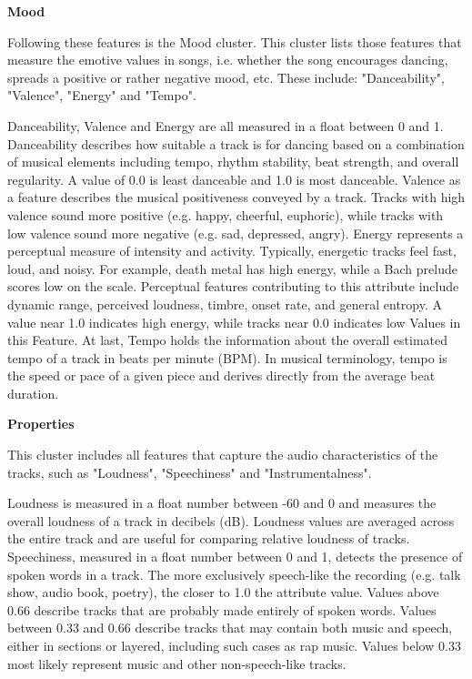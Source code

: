 \textbf{Mood}

Following these features is the Mood cluster.
This cluster lists those features that measure the emotive values in songs, 
i.e. whether the song encourages dancing, spreads a positive or rather negative mood,
etc. These include: "Danceability", "Valence", "Energy" and "Tempo".

Danceability, Valence and Energy are all measured in a float between 0 and 1. 
Danceability describes how suitable a track is for dancing based on a combination of musical elements
including tempo, rhythm stability, beat strength, and overall regularity. 
A value of 0.0 is least danceable and 1.0 is most danceable.
Valence as a feature describes the musical positiveness conveyed by a track. 
Tracks with high valence sound more positive (e.g. happy, cheerful, euphoric),
while tracks with low valence sound more negative (e.g. sad, depressed, angry).  
Energy represents a perceptual measure of intensity and activity.
Typically, energetic tracks feel fast, loud, and noisy. 
For example, death metal has high energy, while a Bach prelude scores low on the scale.
Perceptual features contributing to this attribute include dynamic range, 
perceived loudness, timbre, onset rate, and general entropy. A value near 1.0 indicates high energy,
while tracks near 0.0 indicates low Values in this Feature. 
At last, Tempo holds the information about the overall estimated tempo of a track in beats per
minute (BPM). 
In musical terminology, tempo is the speed or pace of a given piece and derives directly from the
average beat duration.

\textbf{Properties}

This cluster includes all features that capture the audio characteristics of the tracks,
such as "Loudness", "Speechiness" and "Instrumentalness".

Loudness is measured in a float number between -60 and 0 and measures the overall loudness
of a track in decibels (dB). 
Loudness values are averaged across the entire track and are useful for comparing relative
loudness of tracks. 
Speechiness, measured in a float number between 0 and 1, detects the presence of spoken words in a track. 
The more exclusively speech-like the recording (e.g. talk show, audio book, poetry),
the closer to 1.0 the attribute value. 
Values above 0.66 describe tracks that are probably made entirely of spoken words.
Values between 0.33 and 0.66 describe tracks that may contain both music and speech, 
either in sections or layered, including such cases as rap music.
Values below 0.33 most likely represent music and other non-speech-like tracks. 

